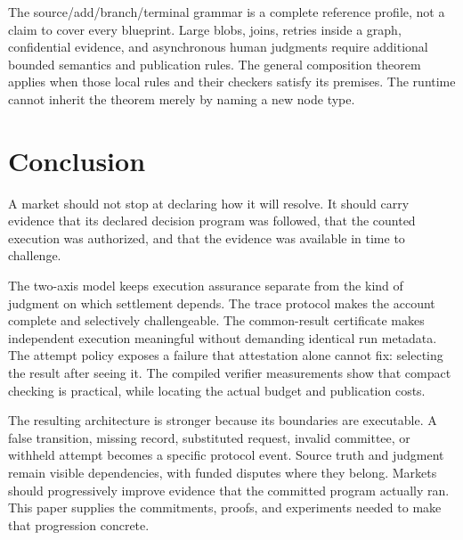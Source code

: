 The source/add/branch/terminal grammar is a complete reference profile, not a claim to cover every blueprint. Large blobs, joins, retries inside a graph, confidential evidence, and asynchronous human judgments require additional bounded semantics and publication rules. The general composition theorem applies when those local rules and their checkers satisfy its premises. The runtime cannot inherit the theorem merely by naming a new node type.

\section{Conclusion}

A market should not stop at declaring how it will resolve. It should carry evidence that its declared decision program was followed, that the counted execution was authorized, and that the evidence was available in time to challenge.

The two-axis model keeps execution assurance separate from the kind of judgment on which settlement depends. The trace protocol makes the account complete and selectively challengeable. The common-result certificate makes independent execution meaningful without demanding identical run metadata. The attempt policy exposes a failure that attestation alone cannot fix: selecting the result after seeing it. The compiled verifier measurements show that compact checking is practical, while locating the actual budget and publication costs.

The resulting architecture is stronger because its boundaries are executable. A false transition, missing record, substituted request, invalid committee, or withheld attempt becomes a specific protocol event. Source truth and judgment remain visible dependencies, with funded disputes where they belong. Markets should progressively improve evidence that the committed program actually ran. This paper supplies the commitments, proofs, and experiments needed to make that progression concrete.
